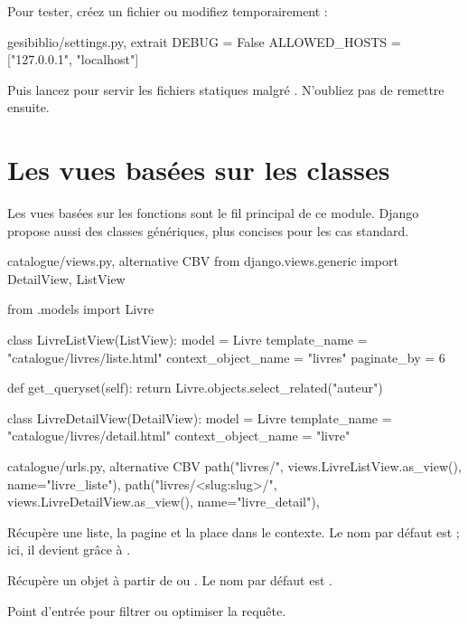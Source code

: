 Pour tester, créez un fichier  ou modifiez temporairement
 :

\begin{codebox}[python]{gesibiblio/settings.py, extrait}
DEBUG = False
ALLOWED_HOSTS = ["127.0.0.1", "localhost"]
\end{codebox}

Puis lancez  pour servir les fichiers
statiques malgré . N'oubliez pas de remettre
 ensuite.

\section{Les vues basées sur les classes}

Les vues basées sur les fonctions sont le fil principal de ce module. Django
propose aussi des classes génériques, plus concises pour les cas standard.

\begin{codebox}[python]{catalogue/views.py, alternative CBV}
from django.views.generic import DetailView, ListView

from .models import Livre


class LivreListView(ListView):
    model = Livre
    template_name = "catalogue/livres/liste.html"
    context_object_name = "livres"
    paginate_by = 6

    def get_queryset(self):
        return Livre.objects.select_related("auteur")


class LivreDetailView(DetailView):
    model = Livre
    template_name = "catalogue/livres/detail.html"
    context_object_name = "livre"
\end{codebox}

\begin{codebox}[python]{catalogue/urls.py, alternative CBV}
path("livres/", views.LivreListView.as_view(), name="livre_liste"),
path("livres/<slug:slug>/", views.LivreDetailView.as_view(), name="livre_detail"),
\end{codebox}

\begin{description}[leftmargin=4.4cm,style=nextline]
  \item[\code{ListView}] Récupère une liste, la pagine et la place dans le
  contexte. Le nom par défaut est  ; ici, il devient
   grâce à .
  \item[\code{DetailView}] Récupère un objet à partir de  ou
  . Le nom par défaut est .
  \item[\code{get\_queryset()}] Point d'entrée pour filtrer ou optimiser la
  requête.
\end{description}

